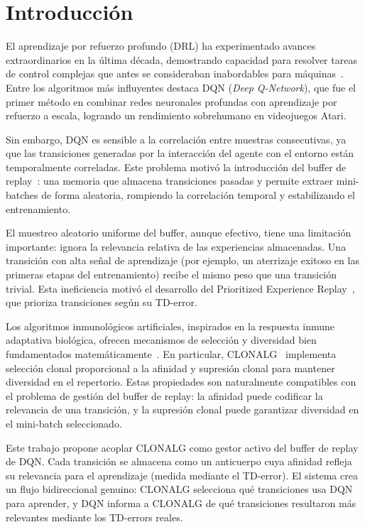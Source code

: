 \documentclass[12pt,a4paper]{article}
\begin{document}
\section{Introducción}
 
El aprendizaje por refuerzo profundo (DRL) ha experimentado avances
extraordinarios en la última década, demostrando capacidad para resolver
tareas de control complejas que antes se consideraban inabordables para
máquinas~\cite{mnih2015dqn}. Entre los algoritmos más influyentes destaca
DQN (\textit{Deep Q-Network}), que fue el primer método en combinar redes
neuronales profundas con aprendizaje por refuerzo a escala, logrando un
rendimiento sobrehumano en videojuegos Atari.
 
Sin embargo, DQN es sensible a la correlación entre muestras consecutivas,
ya que las transiciones generadas por la interacción del agente con el
entorno están temporalmente correladas. Este problema motivó la introducción
del buffer de replay~\cite{lin1992rl}: una memoria que almacena transiciones
pasadas y permite extraer mini-batches de forma aleatoria, rompiendo la
correlación temporal y estabilizando el entrenamiento.
 
El muestreo aleatorio uniforme del buffer, aunque efectivo, tiene una
limitación importante: ignora la relevancia relativa de las experiencias
almacenadas. Una transición con alta señal de aprendizaje (por ejemplo, un
aterrizaje exitoso en las primeras etapas del entrenamiento) recibe el mismo
peso que una transición trivial. Esta ineficiencia motivó el desarrollo del
Prioritized Experience Replay~\cite{schaul2015per}, que prioriza transiciones
según su TD-error.
 
Los algoritmos inmunológicos artificiales, inspirados en la respuesta inmune
adaptativa biológica, ofrecen mecanismos de selección y diversidad bien
fundamentados matemáticamente~\cite{dasgupta1999ais}. En particular,
CLONALG~\cite{decastro2002clonalg} implementa selección clonal proporcional
a la afinidad y supresión clonal para mantener diversidad en el repertorio.
Estas propiedades son naturalmente compatibles con el problema de gestión
del buffer de replay: la afinidad puede codificar la relevancia de una
transición, y la supresión clonal puede garantizar diversidad en el
mini-batch seleccionado.
 
Este trabajo propone acoplar CLONALG como gestor activo del buffer de replay
de DQN. Cada transición se almacena como un anticuerpo cuya afinidad refleja
su relevancia para el aprendizaje (medida mediante el TD-error). El sistema
crea un flujo bidireccional genuino: CLONALG selecciona qué transiciones usa
DQN para aprender, y DQN informa a CLONALG de qué transiciones resultaron
más relevantes mediante los TD-errors reales.
 
\end{document}

